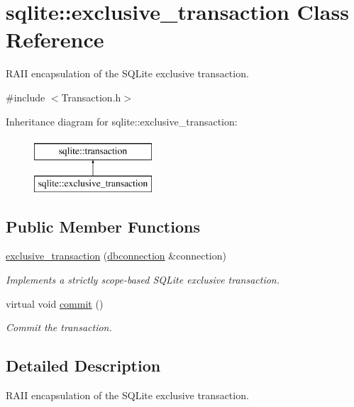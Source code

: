 \hypertarget{a00007}{\section{sqlite\-:\-:exclusive\-\_\-transaction Class Reference}
\label{a00007}
}


R\-A\-I\-I encapsulation of the S\-Q\-Lite exclusive transaction.  




{\ttfamily \#include $<$Transaction.\-h$>$}

Inheritance diagram for sqlite\-:\-:exclusive\-\_\-transaction\-:\begin{figure}[H]
\begin{center}
\leavevmode
\includegraphics[height=2.000000cm]{a00007}
\end{center}
\end{figure}
\subsection*{Public Member Functions}
\begin{DoxyCompactItemize}
\item 
\hyperlink{a00007_a9380f63712877dd18432ca82476dd096}{exclusive\-\_\-transaction} (\hyperlink{a00004}{dbconnection} \&connection)
\begin{DoxyCompactList}\small\item\em Implements a strictly scope-\/based S\-Q\-Lite exclusive transaction. \end{DoxyCompactList}\item 
\hypertarget{a00014_abe219dd0bf949d569381f9830c7b2d1a}{virtual void \hyperlink{a00014_abe219dd0bf949d569381f9830c7b2d1a}{commit} ()}\label{a00014_abe219dd0bf949d569381f9830c7b2d1a}

\begin{DoxyCompactList}\small\item\em Commit the transaction. \end{DoxyCompactList}\end{DoxyCompactItemize}


\subsection{Detailed Description}
R\-A\-I\-I encapsulation of the S\-Q\-Lite exclusive transaction. 

